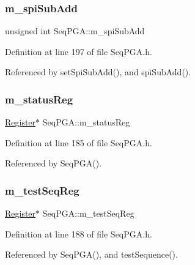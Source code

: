 \subsubsection{\texorpdfstring{m\+\_\+spi\+Sub\+Add}{m\_spiSubAdd}}
{\footnotesize\ttfamily unsigned int Seq\+P\+G\+A\+::m\+\_\+spi\+Sub\+Add\hspace{0.3cm}{\ttfamily [private]}}



Definition at line 197 of file Seq\+P\+G\+A.\+h.



Referenced by set\+Spi\+Sub\+Add(), and spi\+Sub\+Add().

\mbox{\label{classSeqPGA_ae39eb15fbde7a4a48376c8cbdbbceeaa}} 
\subsubsection{\texorpdfstring{m\+\_\+status\+Reg}{m\_statusReg}}
{\footnotesize\ttfamily \hyperlink{classRegister}{Register}$\ast$ Seq\+P\+G\+A\+::m\+\_\+status\+Reg\hspace{0.3cm}{\ttfamily [private]}}



Definition at line 185 of file Seq\+P\+G\+A.\+h.



Referenced by Seq\+P\+G\+A().

\mbox{\label{classSeqPGA_a7478537516c951a4d08f23b0789ed6d9}} 
\subsubsection{\texorpdfstring{m\+\_\+test\+Seq\+Reg}{m\_testSeqReg}}
{\footnotesize\ttfamily \hyperlink{classRegister}{Register}$\ast$ Seq\+P\+G\+A\+::m\+\_\+test\+Seq\+Reg\hspace{0.3cm}{\ttfamily [private]}}



Definition at line 188 of file Seq\+P\+G\+A.\+h.



Referenced by Seq\+P\+G\+A(), and test\+Sequence().

